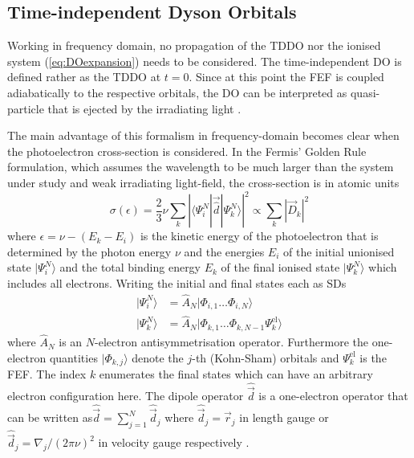 {\subsection{Time-independent Dyson Orbitals}
Working in frequency domain, no propagation of the TDDO nor the ionised system (\ref{eq:DOexpansion}) needs to be considered.
The time-independent DO is defined rather as the TDDO at $t=0$.
Since at this point the FEF is coupled adiabatically to the respective orbitals, the DO can be interpreted as quasi-particle that is ejected by the irradiating light \cite{ezDyson}.

The main advantage of this formalism in frequency-domain becomes clear when the photoelectron cross-section is considered.
In the Fermis' Golden Rule formulation, which assumes the wavelength to be much larger than the system under study and weak irradiating light-field, the cross-section is in atomic units \cite{richardsFD,MAgg}
\begin{equation} \label{eq:sigma}
\sigma(\epsilon) =\frac 23
           \nu \sum_k\left| \langle \Psi^N_i | \vec{\hat{d}} | \Psi^N_{k}\rangle
\right|^2  
             \propto \sum_k \left|  \vec{D}_k \right| ^2
\end{equation}
where $\epsilon=\nu-(E_k-E_i)$ is the kinetic energy of the photoelectron that is determined by the photon energy $\nu$ and the energies $E_i$ of the initial unionised state $|\Psi^N_i \rangle$ and the total binding energy $E_k$ of the final ionised state $|\Psi^N_k\rangle$ which includes all electrons.
Writing the initial and final states each as SDs
\begin{subequations} \label{eq:SDs} \begin{align}
   |\Psi^N_i\rangle &= \hat{A}_N | \Phi_{i,1} \hdots \Phi_{i,N} \rangle \\
   |\Psi^N_k \rangle &= \hat{A}_N | \Phi_{k,1}\hdots \Phi_{k,N-1} \Psi_k^\text{el} \rangle
\end{align}\end{subequations}
where $\hat{A}_N$ is an $N$-electron antisymmetrisation operator.
Furthermore the one-electron quantities $|\Phi_{k,j}\rangle$ denote the $j$-th (Kohn-Sham) orbitals and $\Psi_k^\text{el}$ is the FEF.
The index $k$ enumerates the final states which can have an arbitrary electron configuration here.
The dipole operator $\hat{\vec{d}}$ is a one-electron operator that can be written as$\hat{\vec{d}}=\sum_{j=1}^N \hat{\vec{d}}_j$ where $\hat{\vec{d}}_j=\vec{r}_j$ in length gauge or $\hat{\vec{d}}_j=\nabla_j/(2\pi\nu)^2$ in velocity gauge respectively \cite{richardsFD}.

}
